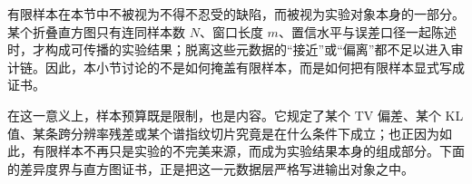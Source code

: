 有限样本在本节中不被视为不得不忍受的缺陷，而被视为实验对象本身的一部分。某个折叠直方图只有连同样本数 \(N\)、窗口长度 \(m\)、置信水平与误差口径一起陈述时，才构成可传播的实验结果；脱离这些元数据的“接近”或“偏离”都不足以进入审计链。因此，本小节讨论的不是如何掩盖有限样本，而是如何把有限样本显式写成证书。

在这一意义上，样本预算既是限制，也是内容。它规定了某个 TV 偏差、某个 KL 值、某条跨分辨率残差或某个谱指纹切片究竟是在什么条件下成立；也正因为如此，有限样本不再只是实验的不完美来源，而成为实验结果本身的组成部分。下面的差异度界与直方图证书，正是把这一元数据层严格写进输出对象之中。
